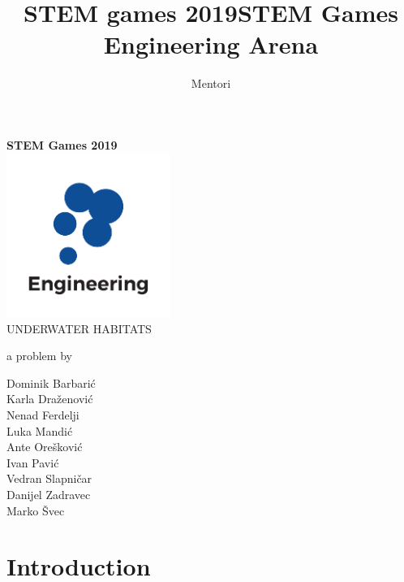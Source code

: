 \documentclass{article}
\title{STEM games 2019}
\author{Mentori}
\title{STEM Games Engineering Arena}
\date{}
\begin{document}
	
	\thispagestyle{empty}
	\newpage
	\thispagestyle{empty}
	\vspace*{0cm}
	\begin{center}
		
		\textbf{\Huge{STEM Games 2019}}\\
		\vspace*{2.4cm}
		\includegraphics[width=0.4\textwidth]{logos/engineering} \\
		\vspace*{2.4cm}
		\huge{UNDERWATER HABITATS}
		
		\medskip
		
		\normalsize{a problem by}
		
		\medskip
		
		Dominik Barbarić \\
		Karla Draženović \\
		Nenad Ferdelji \\
		Luka Mandić \\
		Ante Orešković \\
		Ivan Pavić \\
		Vedran Slapničar \\
		Danijel Zadravec \\
		Marko Švec 
		
		\vspace{6cm}
		
		
		\normalsize{}
	\end{center}
	
	\newpage
		
	\section{Introduction}
	
\end{document}
